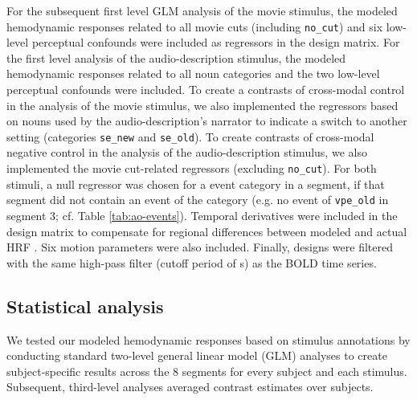 \documentclass[english]{article}
\begin{document}
For the subsequent first level GLM analysis of the movie stimulus, the modeled
hemodynamic responses related to all movie cuts (including \texttt{no\_cut}) and
six low-level perceptual confounds were included as regressors in the design
matrix.
For the first level analysis of the audio-description stimulus, the modeled hemodynamic
responses related to all noun categories and the two low-level perceptual
confounds were included.
To create a contrasts of cross-modal control in the analysis of the movie stimulus,
we also implemented the regressors based on nouns used by the
audio-description's narrator to indicate a switch to another setting (categories
\texttt{se\_new} and \texttt{se\_old}).
To create contrasts of cross-modal negative control in the analysis of the audio-description
stimulus, we also implemented the movie cut-related regressors
(excluding \texttt{no\_cut}).
For both stimuli, a null regressor was chosen for a event category in a segment,
if that segment did not contain an event of the category (e.g. no event of
\texttt{vpe\_old} in segment 3; cf. Table \ref{tab:ao-events}).
Temporal derivatives were included in the design matrix to compensate for
regional differences between modeled and actual HRF \citep{friston1998event}.
Six motion parameters were also included.
Finally, designs were filtered with the same high-pass filter (cutoff period of
\unit[150]{s}) as the BOLD time series.


\subsection{Statistical analysis}

We tested our modeled hemodynamic responses based on stimulus annotations by
conducting standard two-level general linear model (GLM) analyses to create
subject-specific results across the 8 segments for every subject and each
stimulus.
Subsequent, third-level analyses averaged contrast estimates over subjects.
\end{document}
